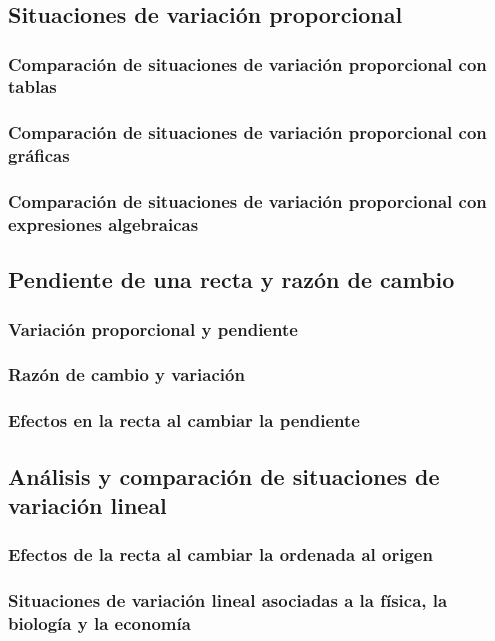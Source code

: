 \documentclass[11pt]{book}
\begin{document}
\chapter{}

\section{Situaciones de variación proporcional}
\subsection{Comparación de situaciones de variación proporcional con tablas}
\subsection{Comparación de situaciones de variación proporcional con gráficas}
\subsection{Comparación de situaciones de variación proporcional con expresiones algebraicas}

\section{Pendiente de una recta y razón de cambio}
\subsection{Variación proporcional y pendiente}
\subsection{Razón de cambio y variación}
\subsection{Efectos en la recta al cambiar la pendiente}

\section{Análisis y comparación de situaciones de variación lineal}
\subsection{Efectos de la recta al cambiar la ordenada al origen}
\subsection{Situaciones de variación lineal asociadas a la física, la biología y la economía}
\end{document}

